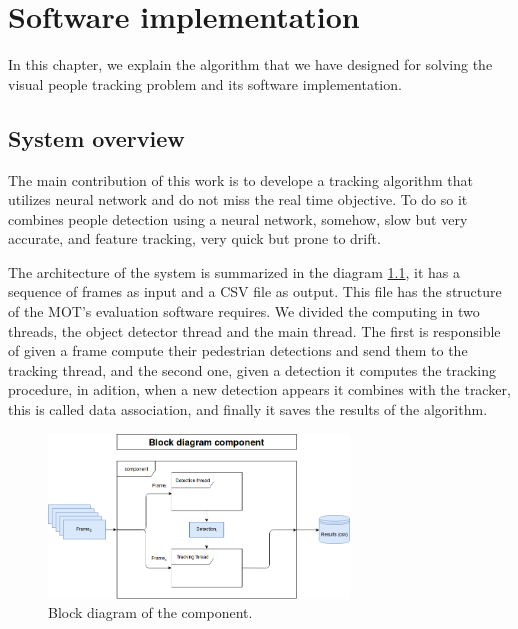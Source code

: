 \chapter{Software implementation}\label{cap.software}

In this chapter, we explain the algorithm that we have designed for solving the visual people tracking problem and its software implementation. 

\section{System overview}

The main contribution of this work is to develope a tracking algorithm that utilizes neural network and do not miss the real time objective. To do so it combines people detection using a neural network, somehow, slow but very accurate, and feature tracking, very quick but prone to drift. 

The architecture of the system is summarized in the diagram \ref{software1}, it has a sequence of frames as input and a CSV file as output. This file has the structure of the MOT's evaluation software requires. We divided the computing in two threads, the object detector thread and the main thread. The first is responsible of given a frame compute their pedestrian detections and send them to the tracking thread, and the second one, given a detection it computes the tracking procedure, in adition, when a new detection appears it combines with the tracker, this is called data association, and finally it saves the results of the algorithm.



\begin{figure}[H]
\centering         
\includegraphics[width=8cm]{flows/bloque.png}
\caption{Block diagram of the component.} \label{software1}
\end{figure}


